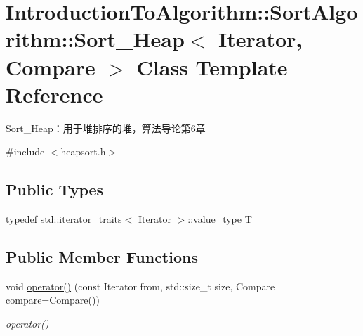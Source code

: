 \hypertarget{class_introduction_to_algorithm_1_1_sort_algorithm_1_1_sort___heap}{}\section{Introduction\+To\+Algorithm\+:\+:Sort\+Algorithm\+:\+:Sort\+\_\+\+Heap$<$ Iterator, Compare $>$ Class Template Reference}
\label{class_introduction_to_algorithm_1_1_sort_algorithm_1_1_sort___heap}


Sort\+\_\+\+Heap：用于堆排序的堆，算法导论第6章  




{\ttfamily \#include $<$heapsort.\+h$>$}

\subsection*{Public Types}
\begin{DoxyCompactItemize}
\item 
typedef std\+::iterator\+\_\+traits$<$ Iterator $>$\+::value\+\_\+type \hyperlink{class_introduction_to_algorithm_1_1_sort_algorithm_1_1_sort___heap_aa28e65622bff17971244413fbccbc478}{T}
\end{DoxyCompactItemize}
\subsection*{Public Member Functions}
\begin{DoxyCompactItemize}
\item 
void \hyperlink{class_introduction_to_algorithm_1_1_sort_algorithm_1_1_sort___heap_a836a88c4f12e3eebc131be2ed7ef0bf3}{operator()} (const Iterator from, std\+::size\+\_\+t size, Compare compare=Compare())
\begin{DoxyCompactList}\small\item\em operator() \end{DoxyCompactList}\end{DoxyCompactItemize}
